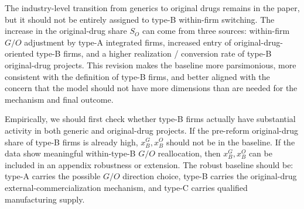 \documentclass[12pt]{article}
\begin{document}
The industry-level transition from generics to original drugs remains in the paper, but it should not be entirely assigned to type-B within-firm switching. The increase in the original-drug share $S_O$ can come from three sources: within-firm $G/O$ adjustment by type-A integrated firms, increased entry of original-drug-oriented type-B firms, and a higher realization / conversion rate of type-B original-drug projects. This revision makes the baseline more parsimonious, more consistent with the definition of type-B firms, and better aligned with the concern that the model should not have more dimensions than are needed for the mechanism and final outcome.

Empirically, we should first check whether type-B firms actually have substantial activity in both generic and original-drug projects. If the pre-reform original-drug share of type-B firms is already high, $x_B^G,x_B^O$ should not be in the baseline. If the data show meaningful within-type-B $G/O$ reallocation, then $x_B^G,x_B^O$ can be included in an appendix robustness or extension. The robust baseline should be: type-A carries the possible $G/O$ direction choice, type-B carries the original-drug external-commercialization mechanism, and type-C carries qualified manufacturing supply.
\end{document}
